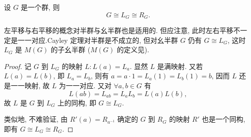 \documentclass[../../main.tex]{subfiles}%
\begin{document}
\begin{theorem}[Cayley定理]\label{theorem:抽象代数-Cayley定理-定理 1.5.1}
设 \( G \) 是一个群, 则
\[
G \cong L_G \cong R_G.
\]
\end{theorem}
\begin{remark}
左平移与右平移的概念对半群与幺半群也是适用的. 但应注意, 此时左右平移不一定是一一对应.Cayley 定理对半群是不成立的, 但对幺半群 \( G \) 仍有 \( G \cong L_G \), 这时 \( L_G \) 是 \( M(G) \) 的子幺半群 (\( M(G) \) 的定义见).
\end{remark}
\begin{proof}
记 \( G \) 到 \( L_G \) 的映射 \( L: L(a) = L_a \). 显然 \( L \) 是满映射. 又若 \( L(a) = L(b) \), 即 \( L_a = L_b \), 则有 \( a = a \cdot 1 = L_a(1) = L_b(1) = b \), 因而 \( L \) 还是一一映射, 故 \( L \) 为一一对应. 又对 \( \forall a,b \in G \) 有
\[
L(ab) = L_{ab} = L_aL_b = L(a)L(b),
\]
故 \( L \) 是 \( G \) 到 \( L_G \) 上的同构, 即 \( G \cong L_G \).

类似地, 不难验证, 由 \( R'(a) = R_{a^{-1}} \) 确定的 \( G \) 到 \( R_G \) 的映射 \( R' \) 也是一个同构, 即有 \( G \cong L_G \cong R_G \).
\end{proof}
\end{document}
